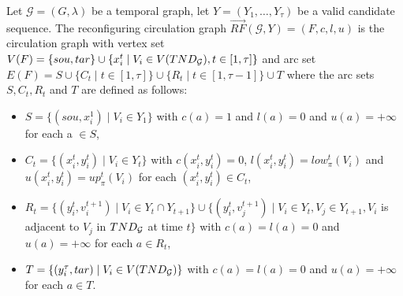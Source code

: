 

\begin{construction}
  \label{const:flow}
  Let $\mathcal{G}=(G,\lambda)$ be a temporal graph, let $Y=(Y_1,\dots,Y_\tau)$ be a valid candidate sequence.  
  The reconfiguring circulation graph $\overrightarrow{RF}(\mathcal{G},Y)=(F,c,l,u)$ is the circulation graph with vertex set $V(F) = \{sou,tar\} \cup \{x_i^t \mid V_i \in V(TND_{\mathcal{G}}), t \in [1,\tau]\}$ and arc set $E(F) = S \cup \{C_t \mid t \in [1,\tau]\} \cup \{R_t \mid t \in [1,\tau-1]\}  \cup T$ where the arc sets $S,C_t ,R_t$ and $T$ are defined as follows: 
  \begin{itemize}
    \item $S= \{ (sou,x_i^1) \mid V_i \in Y_1\}$ with $c(a)=1$ and $l(a)=0$ and $u(a)=+\infty$ for each a $\in S$,
    \item $C_t= \{(x^t_i,y^t_i) \mid V_i \in Y_t\}$ with $c(x^t_i,y^t_i) = 0$, $l(x^t_i,y^t_i) = low^t_\pi(V_i)$ and  $u(x^t_i,y^t_i) = up^t_\pi(V_i)$ for each $(x^t_i,y^t_i)\in C_t$,
    \item $R_t= \{(y^t_i,v^{t+1}_i) \mid V_i \in Y_t \cap Y_{t+1}\} \cup \{(y^t_i,v^{t+1}_j) \mid V_i \in Y_t,V_j \in Y_{t+1}, V_i$ is adjacent to $V_j$ in $TND_{\mathcal{G}}$ at time $t\}$ with $c(a)=l(a)= 0$ and $u(a)=+\infty$ for each $a\in R_t$,
    \item $T = \{(y_i^\tau,tar) \mid V_i \in V(TND_{\mathcal{G}})\}$ with $c(a)=l(a)=0$ and $u(a)=+\infty$ for each $a\in T$.
  \end{itemize}
  \end{construction}


